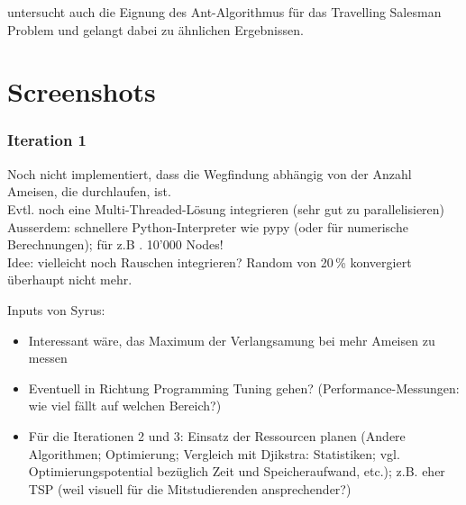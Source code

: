 \citeauthor*{leo-perf} untersucht auch die Eignung des Ant-Algorithmus für das Travelling Salesman Problem und gelangt dabei zu ähnlichen Ergebnissen.

\section{Screenshots}


\subsubsection*{Iteration 1}

Noch nicht implementiert, dass die Wegfindung abhängig von der Anzahl Ameisen, die durchlaufen, ist. \\

Evtl. noch eine Multi-Threaded-Lösung integrieren (sehr gut zu parallelisieren) \\

Ausserdem: schnellere Python-Interpreter wie pypy (oder für numerische Berechnungen); für z.B . 10'000 Nodes! \\

Idee: vielleicht noch Rauschen integrieren? Random von 20\,\% konvergiert überhaupt nicht mehr.

\vspace*{3cm}


Inputs von Syrus: \\

\begin{itemize}
\item Interessant wäre, das Maximum der Verlangsamung bei mehr Ameisen zu messen
\item Eventuell in Richtung Programming Tuning gehen? (Performance-Messungen: wie viel fällt auf welchen Bereich?) 
\item Für die Iterationen 2 und 3: Einsatz der Ressourcen planen (Andere Algorithmen; Optimierung; Vergleich mit Djikstra: Statistiken; vgl. Optimierungspotential bezüglich Zeit und Speicheraufwand, etc.); z.B. eher TSP (weil visuell für die Mitstudierenden ansprechender?) 
\end{itemize}